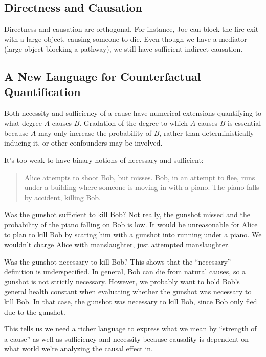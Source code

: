 \documentclass{article}
\begin{document}
\subsection{Directness and Causation}\label{sec:directness-causation}

Directness and causation are orthogonal. For instance, Joe can block the fire exit with a large object, causing someone to die. Even though we have a mediator (large object blocking a pathway), we still have sufficient indirect causation.

\subsection{A New Language for Counterfactual Quantification}

Both necessity and sufficiency of a cause have numerical extensions quantifying to what degree $A$ causes $B$. Gradation of the degree to which $A$ causes $B$ is essential because $A$ may only increase the probability of $B$, rather than deterministically inducing it, or other confounders may be involved.

It's too weak to have binary notions of necessary and sufficient:

\begin{quote}
  Alice attempts to shoot Bob, but misses. Bob, in an attempt to flee, runs under a building where someone is moving in with a piano. The piano falls by accident, killing Bob.
\end{quote}

Was the gunshot sufficient to kill Bob? Not really, the gunshot missed and the probability of the piano falling on Bob is low. It would be unreasonable for Alice to plan to kill Bob by scaring him with a gunshot into running under a piano. We wouldn't charge Alice with manslaughter, just attempted manslaughter.

Was the gunshot necessary to kill Bob? This shows that the ``necessary'' definition is underspecified. In general, Bob can die from natural causes, so a gunshot is not strictly necessary. However, we probably want to hold Bob's general health constant when evaluating whether the gunshot was necessary to kill Bob. In that case, the gunshot was necessary to kill Bob, since Bob only fled due to the gunshot.

This tells us we need a richer language to express what we mean by ``strength of a cause'' as well as sufficiency and necessity because causality is dependent on what world we're analyzing the causal effect in.
\end{document}
